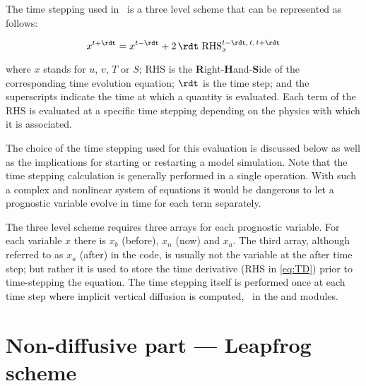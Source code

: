 \documentclass[../main/NEMO_manual]{subfiles}
\begin{document}
The time stepping used in \NEMO\ is a three level scheme that can be represented as follows:

\begin{equation}
  \label{eq:TD}
  x^{t + \rdt} = x^{t - \rdt} + 2 \, \rdt \ \text{RHS}_x^{t - \rdt, \, t, \, t + \rdt}
\end{equation}

where $x$ stands for $u$, $v$, $T$ or $S$;
RHS is the \textbf{R}ight-\textbf{H}and-\textbf{S}ide of the corresponding time evolution equation;
$\rdt$ is the time step;
and the superscripts indicate the time at which a quantity is evaluated.
Each term of the RHS is evaluated at a specific time stepping depending on
the physics with which it is associated.

The choice of the time stepping used for this evaluation is discussed below as well as
the implications for starting or restarting a model simulation.
Note that the time stepping calculation is generally performed in a single operation.
With such a complex and nonlinear system of equations it would be dangerous to
let a prognostic variable evolve in time for each term separately.

The three level scheme requires three arrays for each prognostic variable.
For each variable $x$ there is $x_b$ (before), $x_n$ (now) and $x_a$.
The third array, although referred to as $x_a$ (after) in the code,
is usually not the variable at the after time step;
but rather it is used to store the time derivative (RHS in \autoref{eq:TD})
prior to time-stepping the equation.
The time stepping itself is performed once at each time step where
implicit vertical diffusion is computed,
\ie\ in the  and  modules.

\section{Non-diffusive part --- Leapfrog scheme}
\label{sec:TD_leap_frog}
\end{document}
